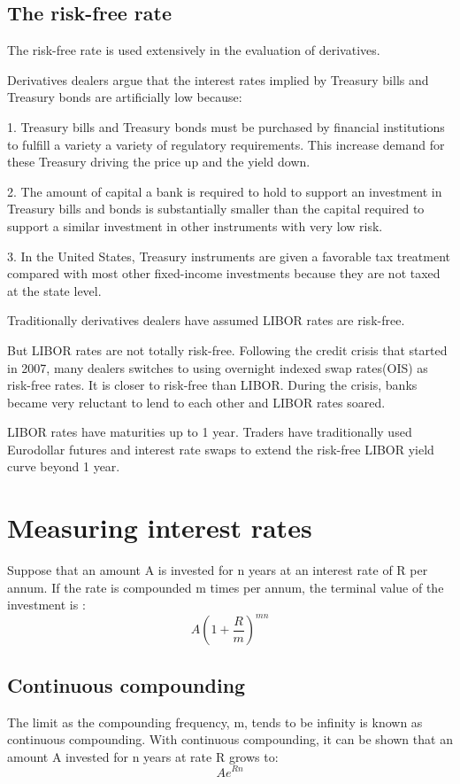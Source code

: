 \documentclass{article}
\begin{document}
\subsection{The risk-free rate}
The risk-free rate is used extensively in the evaluation of derivatives. 

Derivatives dealers argue that the interest rates implied by Treasury bills and Treasury bonds are artificially low because:

1. Treasury bills and Treasury bonds must be purchased by financial institutions to fulfill a variety  a variety of regulatory requirements. This increase demand for these Treasury driving the price up and the yield down.

2. The amount of capital a bank is required to hold to support an investment in Treasury bills and bonds is substantially smaller than the capital required to support a similar investment in other instruments with very low risk.

3. In the United States, Treasury instruments are given a favorable tax treatment compared with most other fixed-income investments because they are not taxed at the state level.
\\ \hspace*{\fill}

Traditionally derivatives dealers have assumed LIBOR rates are risk-free. 

But LIBOR rates are not totally risk-free. Following the credit crisis that started in 2007, many dealers switches to using overnight indexed swap rates(OIS) as risk-free rates. It is closer to risk-free than LIBOR. During the crisis, banks became very reluctant to lend to each other and LIBOR rates soared.

LIBOR rates have maturities up to 1 year. Traders have traditionally used Eurodollar futures and interest rate swaps to extend the risk-free LIBOR yield curve beyond 1 year.

\section{Measuring interest rates}
Suppose that an amount A is invested for n years at an interest rate of R per annum. If the rate is compounded m times per annum, the terminal value of the investment is :
\[
A(1+\frac{R}{m})^{mn}
\]

\subsection{Continuous compounding}
The limit as the compounding frequency, m, tends to be infinity is known as continuous compounding. With continuous compounding, it can be shown that an amount A invested for n years at rate R grows to:
\[
Ae^{Rn}
\]
\end{document}
